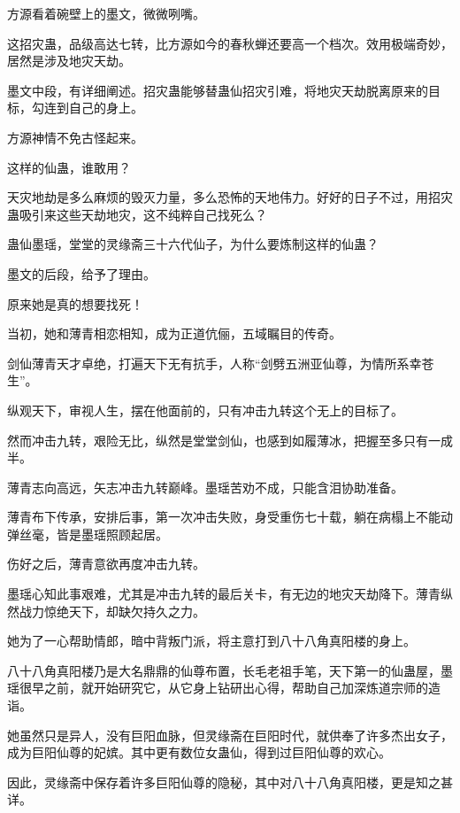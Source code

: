
\begin{this_body}

方源看着碗壁上的墨文，微微咧嘴。

这招灾蛊，品级高达七转，比方源如今的春秋蝉还要高一个档次。效用极端奇妙，居然是涉及地灾天劫。

墨文中段，有详细阐述。招灾蛊能够替蛊仙招灾引难，将地灾天劫脱离原来的目标，勾连到自己的身上。

方源神情不免古怪起来。

这样的仙蛊，谁敢用？

天灾地劫是多么麻烦的毁灭力量，多么恐怖的天地伟力。好好的日子不过，用招灾蛊吸引来这些天劫地灾，这不纯粹自己找死么？

蛊仙墨瑶，堂堂的灵缘斋三十六代仙子，为什么要炼制这样的仙蛊？

墨文的后段，给予了理由。

原来她是真的想要找死！

当初，她和薄青相恋相知，成为正道伉俪，五域瞩目的传奇。

剑仙薄青天才卓绝，打遍天下无有抗手，人称“剑劈五洲亚仙尊，为情所系幸苍生”。

纵观天下，审视人生，摆在他面前的，只有冲击九转这个无上的目标了。

然而冲击九转，艰险无比，纵然是堂堂剑仙，也感到如履薄冰，把握至多只有一成半。

薄青志向高远，矢志冲击九转巅峰。墨瑶苦劝不成，只能含泪协助准备。

薄青布下传承，安排后事，第一次冲击失败，身受重伤七十载，躺在病榻上不能动弹丝毫，皆是墨瑶照顾起居。

伤好之后，薄青意欲再度冲击九转。

墨瑶心知此事艰难，尤其是冲击九转的最后关卡，有无边的地灾天劫降下。薄青纵然战力惊绝天下，却缺欠持久之力。

她为了一心帮助情郎，暗中背叛门派，将主意打到八十八角真阳楼的身上。

八十八角真阳楼乃是大名鼎鼎的仙尊布置，长毛老祖手笔，天下第一的仙蛊屋，墨瑶很早之前，就开始研究它，从它身上钻研出心得，帮助自己加深炼道宗师的造诣。

她虽然只是异人，没有巨阳血脉，但灵缘斋在巨阳时代，就供奉了许多杰出女子，成为巨阳仙尊的妃嫔。其中更有数位女蛊仙，得到过巨阳仙尊的欢心。

因此，灵缘斋中保存着许多巨阳仙尊的隐秘，其中对八十八角真阳楼，更是知之甚详。


\end{this_body}
